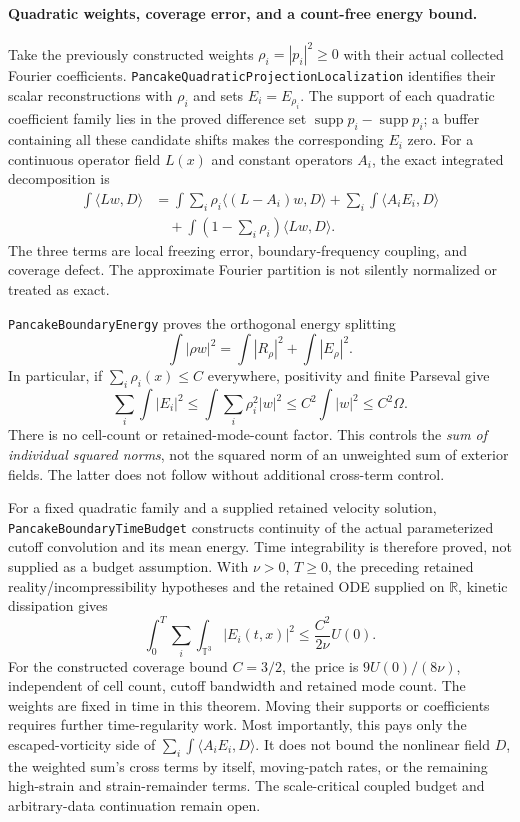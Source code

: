 \documentclass[11pt]{article}
\theoremstyle{definition}
\begin{document}
\paragraph{Quadratic weights, coverage error, and a count-free energy bound.}
Take the previously constructed weights
$\rho_i=|p_i|^2\ge0$ with their actual collected Fourier coefficients.
\texttt{PancakeQuadraticProjectionLocalization} identifies their scalar
reconstructions with $\rho_i$ and sets $E_i=E_{\rho_i}$.
The support of each quadratic coefficient family lies in the proved
difference set $\operatorname{supp}p_i-\operatorname{supp}p_i$; a buffer
containing all these candidate shifts makes the corresponding $E_i$ zero.
For a continuous operator field $L(x)$ and constant operators $A_i$, the
exact integrated decomposition is
\[
 \begin{aligned}
 \int\langle Lw,D\rangle
 &=\int\sum_i\rho_i\langle(L-A_i)w,D\rangle
      +\sum_i\int\langle A_iE_i,D\rangle\\
 &\quad+\int\left(1-\sum_i\rho_i\right)\langle Lw,D\rangle.
 \end{aligned}
\]
The three terms are local freezing error, boundary-frequency coupling,
and coverage defect. The approximate Fourier partition is not silently
normalized or treated as exact.

\texttt{PancakeBoundaryEnergy} proves the orthogonal energy splitting
\[
 \int|\rho w|^2=\int|R_\rho|^2+\int|E_\rho|^2.
\]
In particular, if $\sum_i\rho_i(x)\le C$ everywhere, positivity and
finite Parseval give
\[
 \sum_i\int|E_i|^2
 \le\int\sum_i\rho_i^2|w|^2
 \le C^2\int|w|^2
 \le C^2\Omega.
\]
There is no cell-count or retained-mode-count factor. This controls the
\emph{sum of individual squared norms}, not the squared norm of an
unweighted sum of exterior fields. The latter does not follow without
additional cross-term control.

For a fixed quadratic family and a supplied retained velocity solution,
\texttt{PancakeBoundaryTimeBudget} constructs continuity of the actual
parameterized cutoff convolution and its mean energy. Time integrability
is therefore proved, not supplied as a budget assumption. With $\nu>0$,
$T\ge0$, the preceding retained reality/incompressibility hypotheses
and the retained ODE supplied on $\mathbb R$, kinetic dissipation gives
\[
 \boxed{\quad
 \int_0^T\sum_i\int_{\mathbb T^3}|E_i(t,x)|^2
       \le\frac{C^2}{2\nu}U(0).
 \quad}
\]
For the constructed coverage bound $C=3/2$, the price is
$9U(0)/(8\nu)$, independent of cell count, cutoff bandwidth and retained
mode count. The weights are fixed in time in this theorem. Moving their
supports or coefficients requires further time-regularity work.
Most importantly, this pays only the escaped-vorticity side of
$\sum_i\int\langle A_iE_i,D\rangle$. It does not bound the nonlinear
field $D$, the weighted sum's cross terms by itself, moving-patch rates, or the
remaining high-strain and strain-remainder terms. The scale-critical
coupled budget and arbitrary-data continuation remain open.
\end{document}
